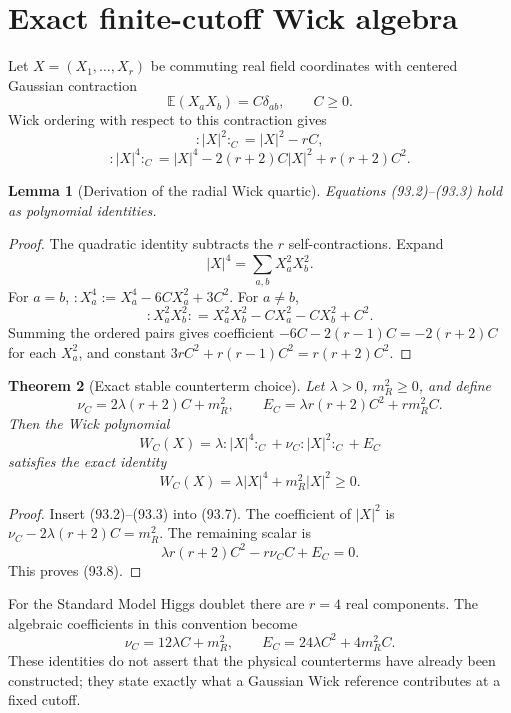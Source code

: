 \documentclass[11pt]{article}
\newtheorem{theorem}{Theorem}[section]
\newtheorem{lemma}[theorem]{Lemma}
\theoremstyle{remark}
\begin{document}
\section{Exact finite-cutoff Wick algebra}

Let \(X=(X_1,\ldots,X_r)\) be commuting real field coordinates with
centered Gaussian contraction
\[
 {\mathbb E}(X_aX_b)=C\delta_{ab},\qquad C\geq0.        \tag{93.1}
\]
Wick ordering with respect to this contraction gives
\[
 :|X|^2:_C=|X|^2-rC,                                  \tag{93.2}
\]
\[
 :|X|^4:_C
 =|X|^4-2(r+2)C|X|^2+r(r+2)C^2.                      \tag{93.3}
\]

\begin{lemma}[Derivation of the radial Wick quartic]
\label{lem:v15v93-wick}
Equations (93.2)--(93.3) hold as polynomial identities.
\end{lemma}

\begin{proof}
The quadratic identity subtracts the \(r\) self-contractions.
Expand
\[
 |X|^4=\sum_{a,b}X_a^2X_b^2.                           \tag{93.4}
\]
For \(a=b\),
\(:X_a^4:=X_a^4-6CX_a^2+3C^2\).  For \(a\ne b\),
\[
 :X_a^2X_b^2:
 =X_a^2X_b^2-CX_a^2-CX_b^2+C^2.                      \tag{93.5}
\]
Summing the ordered pairs gives coefficient
\(-6C-2(r-1)C=-2(r+2)C\) for each \(X_a^2\), and constant
\(3rC^2+r(r-1)C^2=r(r+2)C^2\).
\end{proof}

\begin{theorem}[Exact stable counterterm choice]
\label{thm:v15v93-stable-wick}
Let \(\lambda>0\), \(m_R^2\geq0\), and define
\[
 \nu_C=2\lambda(r+2)C+m_R^2,\qquad
 E_C=\lambda r(r+2)C^2+r m_R^2C.                     \tag{93.6}
\]
Then the Wick polynomial
\[
 W_C(X)
 =\lambda:|X|^4:_C+\nu_C:|X|^2:_C+E_C               \tag{93.7}
\]
satisfies the exact identity
\[
 W_C(X)=\lambda|X|^4+m_R^2|X|^2\geq0.                \tag{93.8}
\]
\end{theorem}

\begin{proof}
Insert (93.2)--(93.3) into (93.7).  The coefficient of
\(|X|^2\) is
\(\nu_C-2\lambda(r+2)C=m_R^2\).  The remaining scalar is
\[
 \lambda r(r+2)C^2-r\nu_CC+E_C=0.                    \tag{93.9}
\]
This proves (93.8).
\end{proof}

For the Standard Model Higgs doublet there are \(r=4\) real
components.  The algebraic coefficients in this convention become
\[
 \nu_C=12\lambda C+m_R^2,\qquad
 E_C=24\lambda C^2+4m_R^2C.                          \tag{93.10}
\]
These identities do not assert that the physical counterterms have
already been constructed; they state exactly what a Gaussian Wick
reference contributes at a fixed cutoff.
\end{document}
